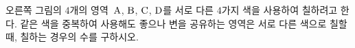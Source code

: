 \hspace*{2mm}\begin{minipage}[t]{\dimexpr\linewidth-2mm\relax}\vspace{0pt}
\noindent\begin{minipage}[t]{0.58\linewidth}\vspace{0pt}\raggedright 오른쪽 그림의 $4$개의 영역~$\mathrm{A}$, $\mathrm{B}$, $\mathrm{C}$, $\mathrm{D}$를 서로 다른 $4$가지 색을 사용하여 칠하려고 한다. 같은 색을 중복하여 사용해도 좋으나 변을 공유하는 영역은 서로 다른 색으로 칠할 때, 칠하는 경우의 수를 구하시오. \end{minipage}\hfill\begin{minipage}[t]{0.4\linewidth}\vspace{0pt}\centering \resizebox{\ifdim\width>\linewidth\linewidth\else\width\fi}{!}{}\end{minipage}\par\end{minipage}
